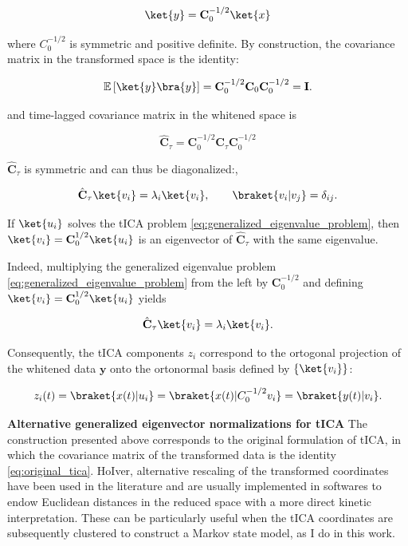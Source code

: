 \begin{equation*}
\ket{y} = \mathbf C_0^{-1/2} \ket{x}
\end{equation*}

where $C_0^{-1/2}$ is symmetric and positive definite. By construction, the covariance matrix in the transformed space is the identity:

\begin{equation*}
\mathbb E\left[\ket{y}\bra{y}\right] = \mathbf{C}_0^{-1/2} \mathbf{C}_0 \mathbf{C}_0^{-1/2} = \mathbf I.
\end{equation*}

and time-lagged covariance matrix in the whitened space is

\begin{equation*}
\hat{\mathbf{C}}_\tau = \mathbf C_0^{-1/2} \mathbf C_\tau \mathbf C_0^{-1/2}
\end{equation*}

$\hat{\mathbf{C}}_\tau$ is symmetric and can thus be diagonalized:,

\begin{equation*}
\hat{\mathbf{C}}_\tau \ket{v_i} = \lambda_i \ket{v_i}, \qquad
\braket{v_i|v_j} = \delta_{ij}.
\end{equation*}

If $\ket{u_i}$ solves the tICA problem \eqref{eq:generalized_eigenvalue_problem}, then $\ket{v_i} = \mathbf C_0^{1/2} \ket{u_i}$ is an eigenvector of $\hat{\mathbf{C}}_\tau$ with the same eigenvalue.

Indeed, multiplying the generalized eigenvalue problem \eqref{eq:generalized_eigenvalue_problem} from the left by $\mathbf C_0^{-1/2}$ and defining
$\ket{v_i} = \mathbf C_0^{1/2}\ket{u_i}$ yields

\begin{equation*}
\hat{\mathbf C}_\tau \ket{v_i} = \lambda_i \ket{v_i}.
\end{equation*}

Consequently, the tICA components $z_i$ correspond to the ortogonal projection of the whitened data $\mathbf{y}$ onto the ortonormal basis defined by $\{\ket{v_i}\}$:

\begin{equation*}
z_i(t) = \braket{x(t)|u_i} = \braket{x(t) | C_0^{-1/2} v_i}  = \braket{y(t) | v_i}.
\end{equation*}


\vspace{1em}
\noindent \textbf{Alternative generalized eigenvector normalizations for tICA}\newline 
The construction presented above corresponds to the original formulation of tICA, in which the covariance matrix of the transformed data is the identity \eqref{eq:original_tica}.
HoIver, alternative rescaling of the transformed coordinates have been used in the literature and are usually implemented in softwares to endow Euclidean distances in the reduced space with a more direct kinetic interpretation. These can 
be particularly useful when the tICA coordinates are subsequently clustered to construct a Markov state model, as I do in this work.

